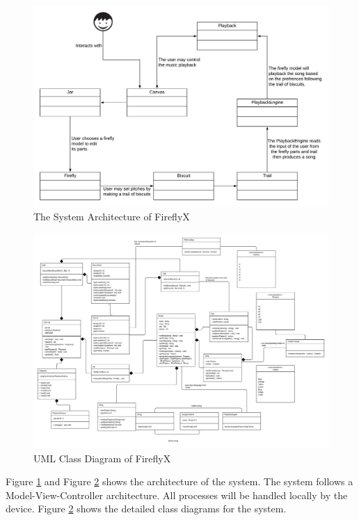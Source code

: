 \begin{figure} [H]
    \centering
    \includegraphics[width=15cm]{figures/NewSysArchi.png}
    \caption{The System Architecture of FireflyX}
    \label{fig:sysarchi}
\end{figure}

\begin{figure} [H]
    \centering
    \includegraphics[width=17cm]{figures/FireflyXUML.png}
    \caption{UML Class Diagram of FireflyX}
    \label{fig:fireflyxUML}
\end{figure}

Figure \ref{fig:sysarchi} and Figure \ref{fig:fireflyxUML} shows the architecture of the system. The system follows a Model-View-Controller architecture. All processes will be handled locally by the device. Figure \ref{fig:fireflyxUML} shows the detailed class diagrams for the system.
    
